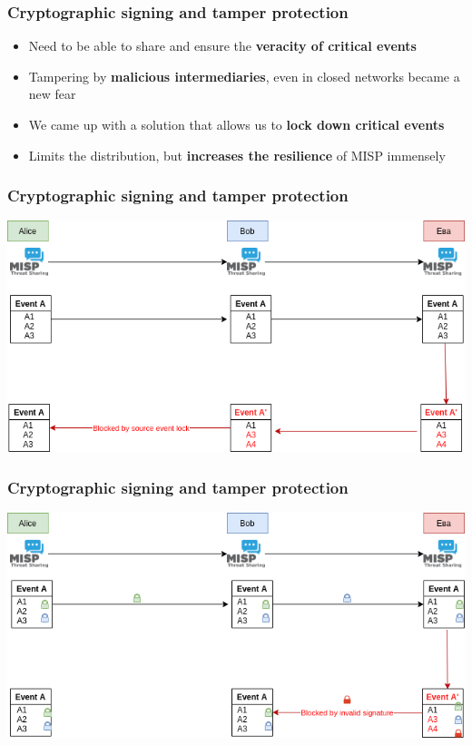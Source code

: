 \begin{frame}
  \frametitle{Cryptographic signing and tamper protection}
  \begin{itemize}
     \item Need to be able to share and ensure the {\bf veracity of critical events}
     \item Tampering by {\bf malicious intermediaries}, even in closed networks became a new fear
     \item We came up with a solution that allows us to {\bf lock down critical events}
     \item Limits the distribution, but {\bf increases the resilience} of MISP immensely
  \end{itemize}
\end{frame}

\begin{frame}
\frametitle{Cryptographic signing and tamper protection}
\includegraphics[scale=0.5]{images/signing1.png}
\end{frame}

\begin{frame}
\frametitle{Cryptographic signing and tamper protection}
\includegraphics[scale=0.5]{images/signing2.png}
\end{frame}

